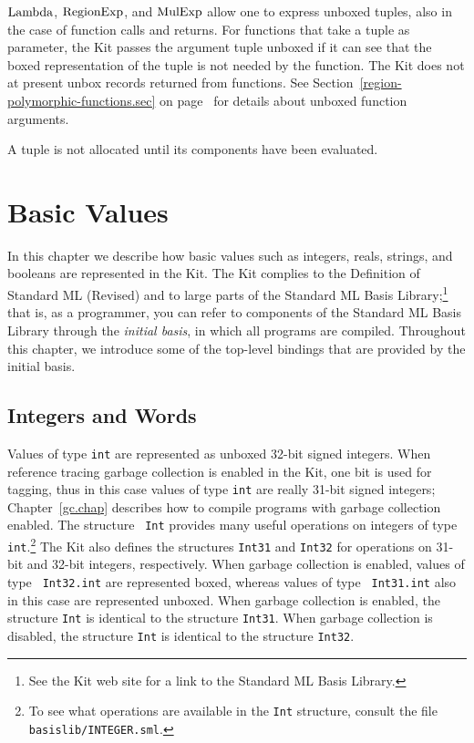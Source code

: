 \documentclass[12pt]{book}
\begin{document}
$\hbox{\rm Lambda}$, $\hbox{\rm RegionExp}$, and $\hbox{\rm MulExp}$ allow one to express unboxed tuples,
also in the case of function calls and returns. For functions that
take a tuple as parameter, the Kit passes the argument tuple unboxed
%
%
%
%
if it can see that the boxed representation of the tuple is not needed
by the function. The Kit does not at present unbox records returned
from functions. See Section~\ref{region-polymorphic-functions.sec} on
page~\pageref{region-polymorphic-functions.sec} for details about
unboxed function arguments.

A tuple is not allocated until its components have been evaluated.

\chapter{Basic Values}
In this chapter we describe how basic values such as integers, reals,
strings, and booleans are represented in the Kit. The Kit complies to
the Definition of Standard ML (Revised)
%
and to large parts of the Standard ML Basis
Library;\footnote{See the Kit web site for a link to the Standard ML
  Basis Library.}
%
that is, as a programmer, you can refer to components of the Standard
ML Basis Library through the
%
{\em initial basis}, in which all programs are compiled.  Throughout
this chapter, we introduce some of the top-level bindings that are
provided by the initial basis.

\section{Integers and Words}
\label{integers.sec}
Values of type 
%
{\tt int} are represented as unboxed 32-bit signed integers. When
reference tracing garbage collection is enabled in the Kit, one bit is
used for tagging, thus in this case values of type {\tt int} are
really 31-bit signed integers; Chapter~\ref{gc.chap} describes how to
compile programs with garbage collection enabled. The structure {\tt
  Int} provides many useful operations on integers of type {\tt
  int}.\footnote{To see what operations are available in the {\tt Int}
  structure, consult the file {\tt basislib/INTEGER.sml}.}  The Kit
also defines the structures 
%
{\tt Int31} and 
%
{\tt Int32} for operations on 31-bit and 32-bit integers,
respectively. When garbage collection is enabled, values of type {\tt
  Int32.int} are represented boxed, whereas values of type {\tt
  Int31.int} also in this case are represented unboxed. When garbage
collection is enabled, the structure {\tt Int} is identical to the
structure {\tt Int31}. When garbage collection is disabled, the
structure {\tt Int} is identical to the structure {\tt Int32}.
\end{document}
